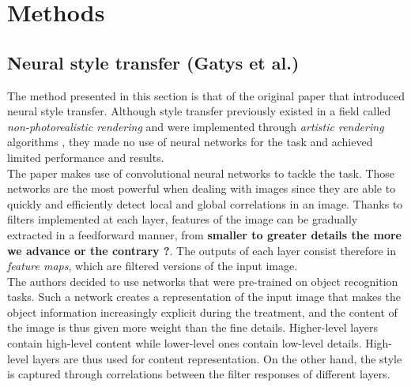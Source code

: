 \documentclass[twocolumn,superscriptaddress,aps]{revtex4-1}
\begin{document}
    
    
    
    \section{Methods}
    
    \subsection{Neural style transfer (Gatys et al.)}\label{methods.gatys}
    
    The method presented in this section is that of the original paper that introduced neural style transfer. Although style transfer previously existed in a field called \emph{non-photorealistic rendering} and were implemented through \emph{artistic rendering} algorithms \cite{DBLP:journals/corr/JingYFYS17}, they made no use of neural networks for the task and achieved limited performance and results.\\
    
    The paper \cite{DBLP:journals/corr/GatysEB15a} makes use of convolutional neural networks to tackle the task. Those networks are the most powerful when dealing with images since they are able to quickly and efficiently detect local and global correlations in an image. Thanks to filters implemented at each layer, features of the image can be gradually extracted in a feedforward manner, from \textbf{smaller to greater details the more we advance or the contrary ?}. The outputs of each layer consist therefore in \emph{feature maps}, which are filtered versions of the input image.\\
    
    The authors decided to use networks that were pre-trained on object recognition tasks. Such a network creates a representation of the input image that makes the object information increasingly explicit during the treatment, and the content of the image is thus given more weight than the fine details. Higher-level layers contain high-level content while lower-level ones contain low-level details. High-level layers are thus used for content representation. On the other hand, the style is captured through correlations between the filter responses of different layers.\\
    
\end{document}
